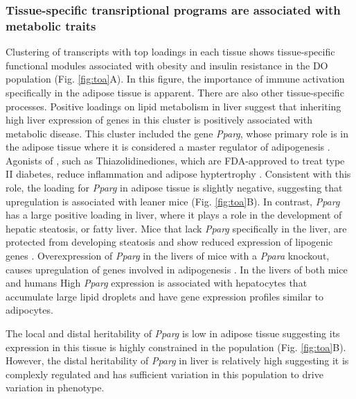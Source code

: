 \documentclass[
]{article}
\begin{document}
\subsubsection{Tissue-specific transriptional programs are associated
with metabolic
traits}\label{tissue-specific-transriptional-programs-are-associated-with-metabolic-traits}

Clustering of transcripts with top loadings in each tissue shows
tissue-specific functional modules associated with obesity and insulin
resistance in the DO population (Fig. \ref{fig:toa}A). In this figure,
the importance of immune activation specifically in the adipose tissue
is apparent. There are also other tissue-specific processes. Positive
loadings on lipid metabolism in liver suggest that inheriting high liver
expression of genes in this cluster is positively associated with
metabolic disease. This cluster included the gene \textit{Pparg}, whose
primary role is in the adipose tissue where it is considered a master
regulator of adipogenesis \cite{pmid17389767}. Agonists of ,
such as Thiazolidinediones, which are FDA-approved to treat type II
diabetes, reduce inflammation and adipose hyptertrophy
\cite{pmid17389767}. Consistent with this role, the loading for
\textit{Pparg} in adipose tissue is slightly negative, suggesting that
upregulation is associated with leaner mice (Fig. \ref{fig:toa}B). In
contrast, \textit{Pparg} has a large positive loading in liver, where it
plays a role in the development of hepatic steatosis, or fatty liver.
Mice that lack \textit{Pparg} specifically in the liver, are protected
from developing steatosis and show reduced expression of lipogenic genes
\cite{pmid12805374, pmid12618528}. Overexpression of \textit{Pparg} in
the livers of mice with a \textit{Ppara} knockout, causes upregulation
of genes involved in adipogenesis \cite{pmid16357043}. In the livers of
both mice and humans \cite{pmid15644454, pmid16403437} High
\textit{Pparg} expression is associated with hepatocytes that accumulate
large lipid droplets and have gene expression profiles similar to
adipocytes.

The local and distal heritability of \textit{Pparg} is low in adipose
tissue suggesting its expression in this tissue is highly constrained in
the population (Fig. \ref{fig:toa}B). However, the distal heritability
of \textit{Pparg} in liver is relatively high suggesting it is complexly
regulated and has sufficient variation in this population to drive
variation in phenotype.
\end{document}
